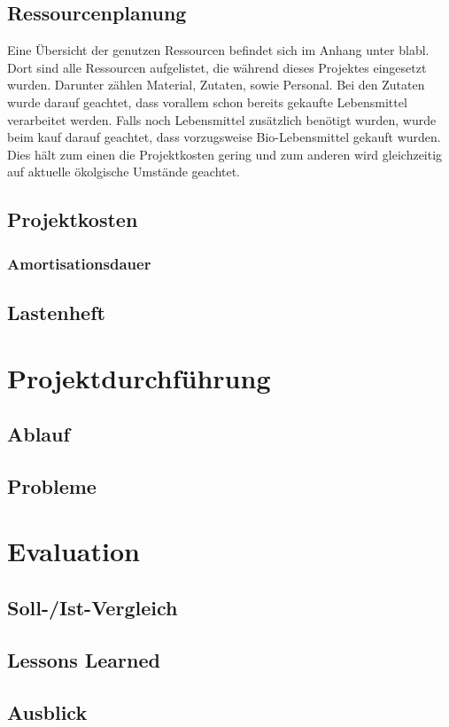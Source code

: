 \subsection{Ressourcenplanung}
Eine Übersicht der genutzen Ressourcen befindet sich im Anhang unter blabl. Dort
sind alle Ressourcen aufgelistet, die während dieses Projektes eingesetzt wurden. Darunter
zählen Material, Zutaten, sowie Personal. Bei den Zutaten wurde darauf geachtet, dass vorallem schon bereits gekaufte Lebensmittel verarbeitet werden.
Falls noch Lebensmittel zusätzlich benötigt wurden, wurde beim kauf darauf geachtet, dass vorzugsweise Bio-Lebensmittel gekauft wurden.
Dies hält zum einen die Projektkosten gering und zum anderen wird gleichzeitig auf aktuelle ökolgische Umstände geachtet.
\subsection{Projektkosten}
\subsubsection{Amortisationsdauer}
\subsection{Lastenheft}

\section{Projektdurchführung}
\subsection{Ablauf}
\subsection{Probleme}

\section{Evaluation}
\subsection{Soll-/Ist-Vergleich}
\subsection{Lessons Learned}
\subsection{Ausblick}